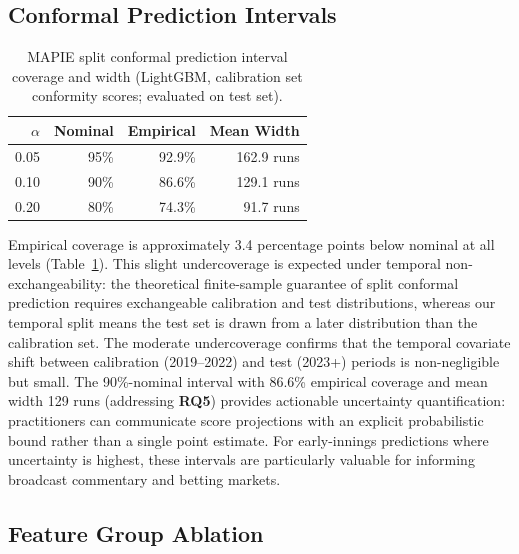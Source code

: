 \documentclass[10pt,a4paper,twocolumn]{article}
\begin{document}
\subsection{Conformal Prediction Intervals}
\label{sec:conformal}

\begin{table}[htbp]
\centering
\caption{MAPIE split conformal prediction interval coverage and width (LightGBM, calibration set conformity scores; evaluated on test set).}
\label{tab:conformal}
\small
\begin{tabular}{rrrr}
\toprule
$\alpha$ & \textbf{Nominal} & \textbf{Empirical} & \textbf{Mean Width} \\
\midrule
0.05 & 95\% & 92.9\% & 162.9 runs \\
0.10 & 90\% & 86.6\% & 129.1 runs \\
0.20 & 80\% & 74.3\% &  91.7 runs \\
\bottomrule
\end{tabular}
\end{table}

Empirical coverage is approximately 3.4 percentage points below nominal at all levels (Table~\ref{tab:conformal}). This slight undercoverage is expected under temporal non-exchangeability: the theoretical finite-sample guarantee of split conformal prediction requires exchangeable calibration and test distributions, whereas our temporal split means the test set is drawn from a later distribution than the calibration set. The moderate undercoverage confirms that the temporal covariate shift between calibration (2019--2022) and test (2023+) periods is non-negligible but small. The 90\%-nominal interval with 86.6\% empirical coverage and mean width 129 runs (addressing \textbf{RQ5}) provides actionable uncertainty quantification: practitioners can communicate score projections with an explicit probabilistic bound rather than a single point estimate. For early-innings predictions where uncertainty is highest, these intervals are particularly valuable for informing broadcast commentary and betting markets.

\subsection{Feature Group Ablation}
\end{document}
